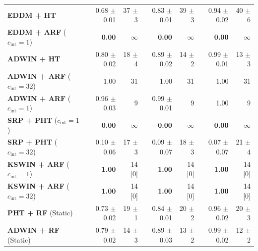\begin{table}[t]
{\begin{tabular}{@{}lrrrrrr@{}}
    \midrule
    \textbf{EDDM + HT}                             & 0.68 {\small $\pm$0.01} & 37 {\small $\pm$3} & 0.83 {\small $\pm$0.01} & 39 {\small $\pm$3} & 0.94 {\small $\pm$0.02} & 40 {\small $\pm$6} \\
    \textbf{EDDM + ARF} ($c_{\mathrm{int}} = 1$)   & \textbf{0.00} & $\infty$ & \textbf{0.00} & $\infty$ & \textbf{0.00} & $\infty$ \\
    \midrule
    \textbf{ADWIN + HT}                            & 0.80 {\small $\pm$0.02} & 18 {\small $\pm$4} & 0.89 {\small $\pm$0.02} & 14 {\small $\pm$2} & 0.99 {\small $\pm$0.01} & 13 {\small $\pm$3} \\
    \textbf{ADWIN + ARF} ($c_{\mathrm{int}} = 32$) & 1.00 & 31 & 1.00 & 31 & 1.00 & 31 \\
    \textbf{ADWIN + ARF} ($c_{\mathrm{int}} = 1$)  & 0.96 {\small $\pm$0.03} & 9 & 0.99 {\small $\pm$0.01} & 9 & 1.00 & 9 \\
    \midrule
    \textbf{SRP + PHT} ($c_{\mathrm{int}} = 1$)    & \textbf{0.00} & $\infty$ & \textbf{0.00} & $\infty$ & \textbf{0.00} & $\infty$ \\
    \textbf{SRP + PHT} ($c_{\mathrm{int}} = 32$)   & 0.10 {\small $\pm$0.06} & 17 {\small $\pm$3} & 0.09 {\small $\pm$0.07} & 18 {\small $\pm$3} & 0.07 {\small $\pm$0.07} & 21 {\small $\pm$4} \\
    \textbf{KSWIN + ARF} ($c_{\mathrm{int}} = 1$)  & \textbf{1.00} & 14 [0] & \textbf{1.00} & 14 [0] & \textbf{1.00} & 14 [0] \\
    \textbf{KSWIN + ARF} ($c_{\mathrm{int}} = 32$) & \textbf{1.00} & 14 [0] & \textbf{1.00} & 14 [0] & \textbf{1.00} & 14 [0] \\
    \midrule
    \textbf{PHT + RF} (Static)                     & 0.73 {\small $\pm$0.02} & 19 {\small $\pm$1} & 0.84 {\small $\pm$0.01} & 20 {\small $\pm$2} & 0.96 {\small $\pm$0.02} & 20 {\small $\pm$3} \\
    \textbf{ADWIN + RF} (Static)                   & 0.79 {\small $\pm$0.02} & 14 {\small $\pm$3} & 0.89 {\small $\pm$0.03} & 13 {\small $\pm$2} & 0.99 {\small $\pm$0.02} & 12 {\small $\pm$2} \\
    \bottomrule
  \end{tabular}}
\end{table}
